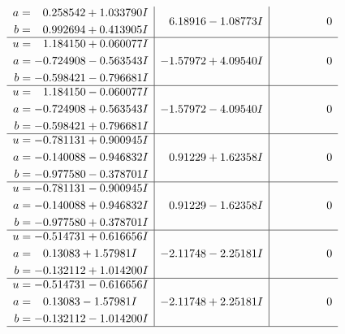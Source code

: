 \documentclass[1p]{elsarticle_modified}
\theoremstyle{definition}
\begin{document}
$$\begin{array}{c|c|c}
\begin{aligned}
a &= \phantom{-}0.258542 + 1.033790 I \\
b &= \phantom{-}0.992694 + 0.413905 I\end{aligned}
 & \phantom{-}6.18916 - 1.08773 I & \phantom{-0.000000 } 0 \\ \hline\begin{aligned}
u &= \phantom{-}1.184150 + 0.060077 I \\
a &= -0.724908 - 0.563543 I \\
b &= -0.598421 - 0.796681 I\end{aligned}
 & -1.57972 + 4.09540 I & \phantom{-0.000000 } 0 \\ \hline\begin{aligned}
u &= \phantom{-}1.184150 - 0.060077 I \\
a &= -0.724908 + 0.563543 I \\
b &= -0.598421 + 0.796681 I\end{aligned}
 & -1.57972 - 4.09540 I & \phantom{-0.000000 } 0 \\ \hline\begin{aligned}
u &= -0.781131 + 0.900945 I \\
a &= -0.140088 - 0.946832 I \\
b &= -0.977580 - 0.378701 I\end{aligned}
 & \phantom{-}0.91229 + 1.62358 I & \phantom{-0.000000 } 0 \\ \hline\begin{aligned}
u &= -0.781131 - 0.900945 I \\
a &= -0.140088 + 0.946832 I \\
b &= -0.977580 + 0.378701 I\end{aligned}
 & \phantom{-}0.91229 - 1.62358 I & \phantom{-0.000000 } 0 \\ \hline\begin{aligned}
u &= -0.514731 + 0.616656 I \\
a &= \phantom{-}0.13083 + 1.57981 I \\
b &= -0.132112 + 1.014200 I\end{aligned}
 & -2.11748 - 2.25181 I & \phantom{-0.000000 } 0 \\ \hline\begin{aligned}
u &= -0.514731 - 0.616656 I \\
a &= \phantom{-}0.13083 - 1.57981 I \\
b &= -0.132112 - 1.014200 I\end{aligned}
 & -2.11748 + 2.25181 I & \phantom{-0.000000 } 0\\
 \hline 

\end{array}$$
\end{document}
